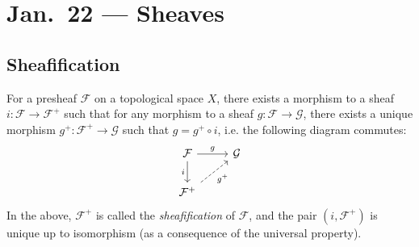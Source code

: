 \chapter{Jan.~22 --- Sheaves}

\section{Sheafification}

\begin{theorem}[Sheafification]
  For a presheaf $\mathcal{F}$ on
  a topological space $X$, there
  exists a morphism
  to a sheaf $i : \mathcal{F} \to \mathcal{F}^+$
  such that for any morphism to a sheaf
  $g : \mathcal{F} \to \mathcal{G}$,
  there exists a unique morphism
  $g^+ : \mathcal{F}^+ \to \mathcal{G}$
  such that
  $g = g^+ \circ i$, i.e. the following
  diagram commutes:
  \[
    \begin{tikzcd}
      \mathcal{F} \ar[d, "i", swap] \ar[r, "g"] & \mathcal{G} \\
      \mathcal{F}^+ \ar[ur, swap, "g^+", dashed]
    \end{tikzcd}
  \]
  In the above, $\mathcal{F}^+$
  is called the \emph{sheafification}
  of $\mathcal{F}$, and the pair
  $(i, \mathcal{F}^+)$ is unique
  up to isomorphism (as a consequence
  of the universal property).
\end{theorem}

